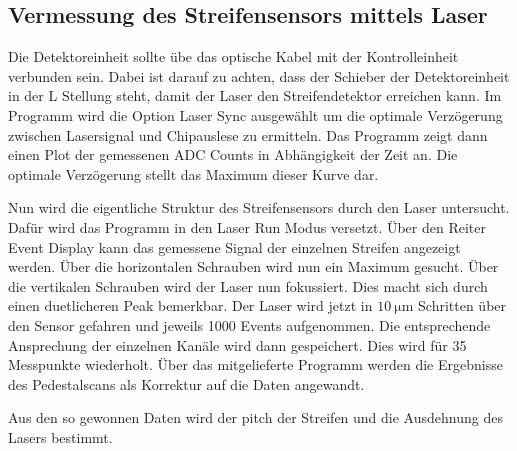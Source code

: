 \subsection{Vermessung des Streifensensors mittels Laser}

Die Detektoreinheit sollte übe das optische Kabel mit der Kontrolleinheit verbunden sein.
Dabei ist darauf zu achten, dass der Schieber der Detektoreinheit in der L Stellung steht, damit der Laser den Streifendetektor erreichen kann.
Im Programm wird die Option Laser Sync ausgewählt um die optimale Verzögerung zwischen Lasersignal und Chipauslese zu ermitteln.
Das Programm zeigt dann einen Plot der gemessenen ADC Counts in Abhängigkeit der Zeit an.
Die optimale Verzögerung stellt das Maximum dieser Kurve dar.

Nun wird die eigentliche Struktur des Streifensensors durch den Laser untersucht.
Dafür wird das Programm in den Laser Run Modus versetzt.
Über den Reiter Event Display kann das gemessene Signal der einzelnen Streifen angezeigt werden.
Über die horizontalen Schrauben wird nun ein Maximum gesucht.
Über die vertikalen Schrauben wird der Laser nun fokussiert.
Dies macht sich durch einen duetlicheren Peak bemerkbar.
Der Laser wird jetzt in $\SI{10}{\micro\metre}$ Schritten über den Sensor gefahren und jeweils 1000 Events aufgenommen.
Die entsprechende Ansprechung der einzelnen Kanäle wird dann gespeichert.
Dies wird für 35 Messpunkte wiederholt.
Über das mitgelieferte Programm werden die Ergebnisse des Pedestalscans als Korrektur auf die Daten angewandt.

Aus den so gewonnen Daten wird der pitch der Streifen und die Ausdehnung des Lasers bestimmt.
